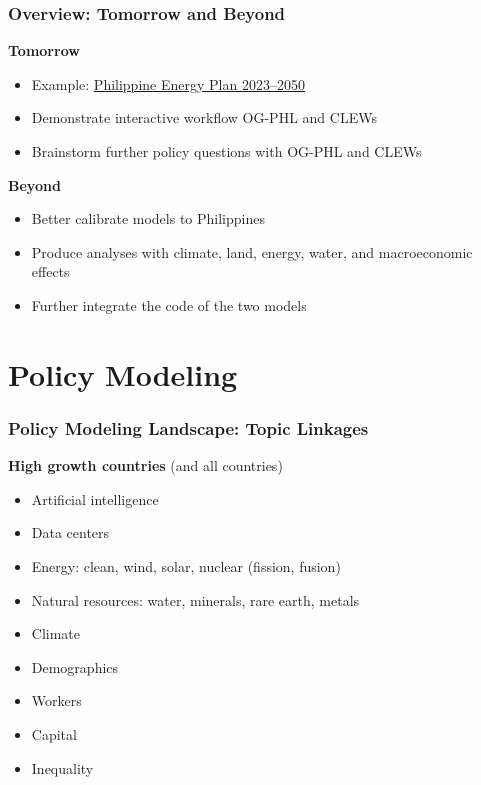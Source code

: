 \documentclass{beamer}
\begin{document}
  \begin{frame}
    \frametitle{Overview: Tomorrow and Beyond}
    \textbf{Tomorrow}
    \begin{itemize}
      \item Example: \href{https://legacy.doe.gov.ph/pep}{Philippine Energy Plan 2023--2050}
      \item Demonstrate interactive workflow OG-PHL and CLEWs
      \item Brainstorm further policy questions with OG-PHL and CLEWs
    \end{itemize}
    \vspace{5mm}
    \textbf{Beyond}
    \begin{itemize}
      \item Better calibrate models to Philippines
      \item Produce analyses with climate, land, energy, water, and macroeconomic effects
      \item Further integrate the code of the two models
    \end{itemize}
  \end{frame}


\section{Policy Modeling}

  \begin{frame}
    \frametitle{Policy Modeling Landscape: Topic Linkages}
    \textbf{High growth countries} (and all countries)
    \vspace{2mm}
    \begin{itemize}
      \item Artificial intelligence
      \vspace{1mm}
      \item Data centers
      \vspace{1mm}
      \item Energy: clean, wind, solar, nuclear (fission, fusion)
      \vspace{1mm}
      \item Natural resources: water, minerals, rare earth, metals
      \vspace{1mm}
      \item Climate
      \vspace{1mm}
      \item Demographics
      \vspace{1mm}
      \item Workers
      \vspace{1mm}
      \item Capital
      \vspace{1mm}
      \item Inequality
    \end{itemize}
  \end{frame}
\end{document}
